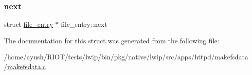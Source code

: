 \subsubsection{\texorpdfstring{next}{next}}
{\footnotesize\ttfamily struct \hyperlink{structfile__entry}{file\+\_\+entry} $\ast$ file\+\_\+entry\+::next}



The documentation for this struct was generated from the following file\+:\begin{DoxyCompactItemize}
\item 
/home/ayush/\+R\+I\+O\+T/tests/lwip/bin/pkg/native/lwip/src/apps/httpd/makefsdata/\hyperlink{native_2lwip_2src_2apps_2httpd_2makefsdata_2makefsdata_8c}{makefsdata.\+c}\end{DoxyCompactItemize}
